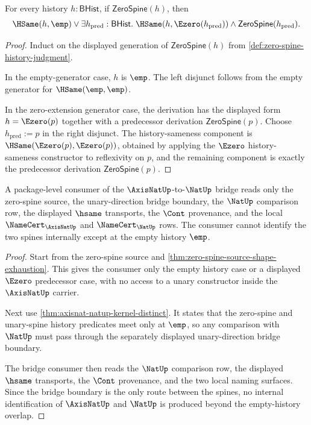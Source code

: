 \begin{theorem}
\label{thm:zero-spine-source-shape-exhaustion}
For every history $h:\mathsf{BHist}$, if $\mathsf{ZeroSpine}(h)$, then
$$
\HSame(h,\emp)\vee
\exists h_{\mathrm{pred}}:\mathsf{BHist}.\;
\HSame(h,\Ezero(h_{\mathrm{pred}}))\land
\mathsf{ZeroSpine}(h_{\mathrm{pred}}).
$$
\end{theorem}
\begin{proof}
Induct on the displayed generation of $\mathsf{ZeroSpine}(h)$ from \autoref{def:zero-spine-history-judgment}.

In the empty-generator case, $h$ is $\emp$. The left disjunct follows from the empty generator for $\HSame(\emp,\emp)$.

In the zero-extension generator case, the derivation has the displayed form $h=\Ezero(p)$ together with a predecessor derivation $\mathsf{ZeroSpine}(p)$. Choose $h_{\mathrm{pred}}:=p$ in the right disjunct. The history-sameness component is $\HSame(\Ezero(p),\Ezero(p))$, obtained by applying the $\Ezero$ history-sameness constructor to reflexivity on $p$, and the remaining component is exactly the predecessor derivation $\mathsf{ZeroSpine}(p)$.
\end{proof}

\begin{theorem}
\label{thm:axisnat-unary-bridge-consumer-example}
A package-level consumer of the $\AxisNatUp$-to-$\NatUp$ bridge reads only the
zero-spine source, the unary-direction bridge boundary, the $\NatUp$ comparison
row, the displayed $\hsame$ transports, the $\Cont$ provenance, and the local
$\NameCert_{\AxisNatUp}$ and $\NameCert_{\NatUp}$ rows. The consumer cannot
identify the two spines internally except at the empty history $\emp$.
\end{theorem}
\begin{proof}
Start from the zero-spine source and
\autoref{thm:zero-spine-source-shape-exhaustion}. This gives the consumer only
the empty history case or a displayed $\Ezero$ predecessor case, with no access
to a unary constructor inside the $\AxisNatUp$ carrier.

Next use \autoref{thm:axisnat-natup-kernel-distinct}. It states that the
zero-spine and unary-spine history predicates meet only at $\emp$, so any
comparison with $\NatUp$ must pass through the separately displayed
unary-direction bridge boundary.

The bridge consumer then reads the $\NatUp$ comparison row, the displayed
$\hsame$ transports, the $\Cont$ provenance, and the two local naming
surfaces. Since the bridge boundary is the only route between the spines, no
internal identification of $\AxisNatUp$ and $\NatUp$ is produced beyond the
empty-history overlap.
\end{proof}

